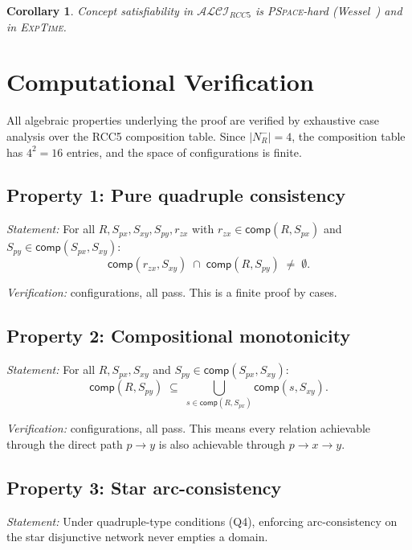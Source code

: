 \documentclass[a4paper,11pt]{article}
\newtheorem{corollary}[theorem]{Corollary}
\theoremstyle{definition}
\newcommand{\ALCIRCC}[1]{\ensuremath{\mathcal{ALCI}_{\mathit{RCC#1}}}}
\newcommand{\NR}{\ensuremath{N_R^{-}}}
\newcommand{\comp}{\ensuremath{\mathsf{comp}}}
\newcommand{\EXPTIME}{\textsc{ExpTime}}
\newcommand{\PSPACE}{\textsc{PSpace}}
\begin{document}
\begin{corollary}
\label{cor:complexity}
Concept satisfiability in $\ALCIRCC{5}$ is \PSPACE-hard
\textup{(}Wessel~\cite{Wessel2003}\textup{)} and in
\EXPTIME.
\end{corollary}


\section{Computational Verification}
\label{sec:computation}

All algebraic properties underlying the proof are verified by
exhaustive case analysis over the RCC5 composition table.  Since
$|\NR| = 4$, the composition table has $4^2 = 16$ entries, and
the space of configurations is finite.

\subsection{Property 1: Pure quadruple consistency}

\emph{Statement:}\; For all $R, S_{px}, S_{xy}, S_{py}, r_{zx}$
with $r_{zx} \in \comp(R, S_{px})$ and
$S_{py} \in \comp(S_{px}, S_{xy})$:
\[
  \comp(r_{zx}, S_{xy}) \;\cap\; \comp(R, S_{py})
  \;\neq\; \emptyset.
\]

\emph{Verification:} configurations, all pass.
This is a finite proof by cases.

\subsection{Property 2: Compositional monotonicity}

\emph{Statement:}\; For all $R, S_{px}, S_{xy}$ and
$S_{py} \in \comp(S_{px}, S_{xy})$:
\[
  \comp(R, S_{py}) \;\subseteq\;
  \bigcup_{s \in \comp(R, S_{px})} \comp(s, S_{xy}).
\]

\emph{Verification:} configurations, all pass.
This means every relation achievable through the direct
path $p \to y$ is also achievable through $p \to x \to y$.

\subsection{Property 3: Star arc-consistency}

\emph{Statement:}\; Under quadruple-type conditions (Q4),
enforcing arc-consistency on the star disjunctive network
never empties a domain.
\end{document}
